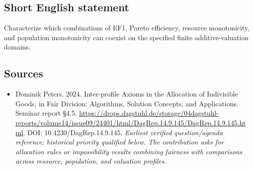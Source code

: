 \documentclass[11pt]{article}
\begin{document}
\subsection{Short English statement}
Characterize which combinations of EF1, Pareto efficiency, resource monotonicity, and population monotonicity can coexist on the specified finite additive-valuation domains.

\subsection{Sources}
\begin{itemize}\raggedright
\item[\textnormal{[S1]}]\hypertarget{source:30007560:1}{} Dominik Peters. 2024. Inter-profile Axioms in the Allocation of Indivisible Goods, in Fair Division: Algorithms, Solution Concepts, and Applications. Seminar report §4.5.
\url{https://drops.dagstuhl.de/storage/04dagstuhl-reports/volume14/issue09/24401/html/DagRep.14.9.145/DagRep.14.9.145.html}.
DOI: 10.4230/DagRep.14.9.145.
{\small\textit{Earliest verified question/agenda reference; historical priority qualified below. The contribution asks for allocation rules or impossibility results combining fairness with comparisons across resource, population, and valuation profiles.}}
\end{itemize}
\end{document}
